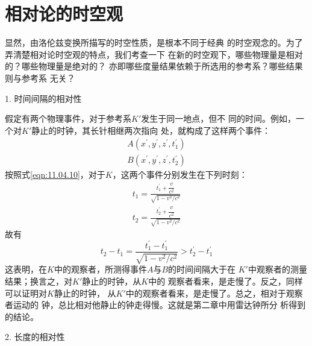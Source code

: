 \section{相对论的时空观}\label{sec:11.05}

显然，由洛伦兹变换所描写的时空性质，是根本不同于经典
的时空观念的。为了弄清楚相对论时空观的特点，我们考查一下
在新的时空观下，哪些物理量是相对的？哪些物理量是绝对的？
亦即哪些度量结果依赖于所选用的参考系？哪些结果则与参考系
无关？

\textsf{1. 时间间隔的相对性}

假定有两个物理事件，对于参考系$ K' $发生于同一地点，但不
同的时间。例如，一个对$ K' $静止的时钟，其长针相继两次指向
处，就构成了这样两个事件：
\begin{align*}
  A \left( x ^ { \prime } , y ^ { \prime } , z ^ { \prime } , t _ { 1 } ^ { \prime } \right) \\
  B \left( x ^ { \prime } , y ^ { \prime } , z ^ { \prime } , t _ { 2 } ^ { \prime } \right)
\end{align*}
按照式\eqref{eqn:11.04.10}，对于$ K $，这两个事件分别发生在下列时刻：
\begin{align*}
  t _ { 1 } = \frac { t _ { 1 } ^ { \prime } + \dfrac { v } { c ^ { 2 } } } { \sqrt { 1 - v ^ { 2 } / c ^ { 2 } } } \\
  t _ { 2 } = \frac { t _ { 2 } ^ { \prime } + \dfrac { v } { c ^ { 2 } } } { \sqrt { 1 - v ^ { 2 } / c ^ { 2 } } }
\end{align*}
故有
\begin{equation}\label{eqn:11.05.01}
  t _ { 2 } - t _ { 1 } = \frac { t _ { 1 } ^ { \prime } - t _ { 1 } ^ { \prime } } { \sqrt{ 1 - v ^ { 2 } / c ^ { 2 } } } > t _ 2 ^ { \prime } - t _ 1 ^ { \prime }
\end{equation}
这表明，在$ K $中的观察者，所测得事件$ A $与$ B $的时间间隔大于在
$ K ' $中观察者的测量结果；换言之，对$ K ' $静止的时钟，从$ K $中的
观察者看来，是走慢了。反之，同样可以证明对$ K $静止的时钟，
从$ K ' $中的观察者看来，是走慢了。总之，相对于观察者运动的
\clearpage\noindent
钟，总比相对他静止的钟走得慢。这就是第二章中用雷达钟所分
析得到的结论。

\textsf{2. 长度的相对性}

